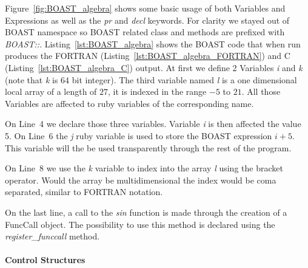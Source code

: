 \documentclass[11pt, a4paper, twoside]{montblanc}
\begin{document}
Figure~\ref{fig:BOAST_algebra} shows some basic usage of both Variables and
Expressions as well as the \emph{pr} and \emph{decl} keywords. For clarity we
stayed out of BOAST namespace so BOAST related class and methods are prefixed
with \emph{BOAST::}. Listing~\ref{lst:BOAST_algebra} shows the BOAST code that
when run produces the FORTRAN (Listing~\ref{lst:BOAST_algebra_FORTRAN}) and C
(Listing~\ref{lst:BOAST_algebra_C}) output. At first we define 2 Variables
\emph{i} and \emph{k} (note that \emph{k} is $64$ bit integer). The third variable
named \emph{l} is a one dimensional local array of a length of $27$, it is indexed
in the range $-5$ to $21$. All those Variables are affected to ruby variables
of the corresponding name.

On Line~4 we declare those three variables. Variable \emph{i} is then affected
the value 5. On Line~6 the \emph{j} ruby variable is used to store the BOAST
expression \emph{$i+5$}. This variable will the be used transparently through
the rest of the program.

On Line~8 we use the \emph{k} variable to index into the array \emph{l} using
the bracket operator. Would the array be multidimensional the index would be
coma separated, similar to FORTRAN notation.

On the last line, a call to the \emph{sin} function is made through the creation
of a FuncCall object.  The possibility to use this method is declared using the
\emph{register\_funccall} method.

      \paragraph{Control Structures}
\end{document}
